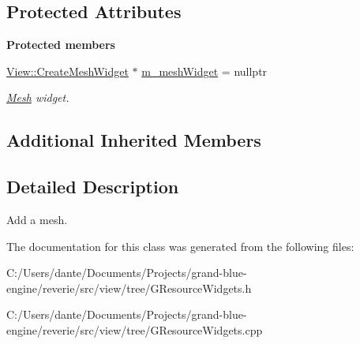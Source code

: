 \subsection*{Protected Attributes}
\begin{Indent}\textbf{ Protected members}\par
\begin{DoxyCompactItemize}
\item 
\mbox{\label{classrev_1_1_add_mesh_command_aed579dac1cec064b9e758b2291ae1300}} 
\mbox{\hyperlink{classrev_1_1_view_1_1_create_mesh_widget}{View\+::\+Create\+Mesh\+Widget}} $\ast$ \mbox{\hyperlink{classrev_1_1_add_mesh_command_aed579dac1cec064b9e758b2291ae1300}{m\+\_\+mesh\+Widget}} = nullptr
\begin{DoxyCompactList}\small\item\em \mbox{\hyperlink{classrev_1_1_mesh}{Mesh}} widget. \end{DoxyCompactList}\end{DoxyCompactItemize}
\end{Indent}
\subsection*{Additional Inherited Members}


\subsection{Detailed Description}
Add a mesh. 

The documentation for this class was generated from the following files\+:\begin{DoxyCompactItemize}
\item 
C\+:/\+Users/dante/\+Documents/\+Projects/grand-\/blue-\/engine/reverie/src/view/tree/G\+Resource\+Widgets.\+h\item 
C\+:/\+Users/dante/\+Documents/\+Projects/grand-\/blue-\/engine/reverie/src/view/tree/G\+Resource\+Widgets.\+cpp\end{DoxyCompactItemize}
